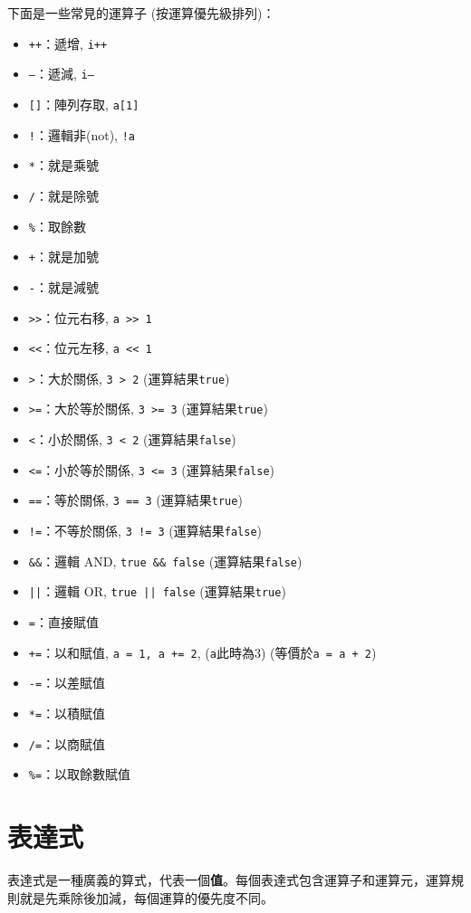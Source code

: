 \documentclass[a4paper, 11pt, oneside]{book}
\begin{document}
下面是一些常見的運算子 (按運算優先級排列)：
\begin{itemize}
\item \texttt{++}：遞增, \texttt{i++}
\item \texttt{--}：遞減, \texttt{i--}
\item \texttt{[]}：陣列存取, \texttt{a[1]}
\item \texttt{!}：邏輯非(not), \texttt{!a}
\item \texttt{*}：就是乘號
\item \texttt{/}：就是除號
\item \texttt{\%}：取餘數
\item \texttt{+}：就是加號
\item \texttt{-}：就是減號
\item \texttt{>>}：位元右移, \texttt{a >> 1}
\item \texttt{<<}：位元左移, \texttt{a << 1}
\item \texttt{>}：大於關係, \texttt{3 > 2} (運算結果\texttt{true})
\item \texttt{>=}：大於等於關係, \texttt{3 >= 3} (運算結果\texttt{true})
\item \texttt{<}：小於關係, \texttt{3 < 2} (運算結果\texttt{false})
\item \texttt{<=}：小於等於關係, \texttt{3 <= 3} (運算結果\texttt{false})
\item \texttt{==}：等於關係, \texttt{3 == 3} (運算結果\texttt{true})
\item \texttt{!=}：不等於關係, \texttt{3 != 3} (運算結果\texttt{false})
\item \texttt{\&\&}：邏輯 AND, \texttt{true \&\& false} (運算結果\texttt{false})
\item \texttt{||}：邏輯 OR, \texttt{true || false} (運算結果\texttt{true})
\item \texttt{=}：直接賦值
\item \texttt{+=}：以和賦值, \texttt{a = 1, a += 2}, (\texttt{a}此時為3) (等價於\texttt{a = a + 2})
\item \texttt{-=}：以差賦值
\item \texttt{*=}：以積賦值
\item \texttt{/=}：以商賦值
\item \texttt{\%=}：以取餘數賦值
\end{itemize}

\section{表達式}
表達式是一種廣義的算式，代表一個\textbf{值}。每個表達式包含運算子和運算元，運算規則就是先乘除後加減，每個運算的優先度不同。
\end{document}
